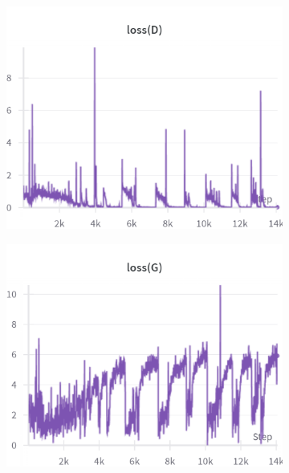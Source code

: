 \begin{figure}[H]
    \centering

    \begin{subfigure}{0.45\textwidth}
        \centering
        \includegraphics[width=0.95\linewidth]{longer_epochs/lossD.png}
        \caption{}
        \label{subfig:longer_epochs/lossD}
    \end{subfigure}%
    \begin{subfigure}{0.45\textwidth}
        \centering
        \includegraphics[width=0.95\linewidth]{longer_epochs/lossG.png}
        \caption{}
        \label{subfig:longer_epochs/lossG}
    \end{subfigure}


\end{figure}
